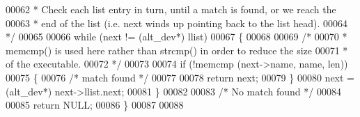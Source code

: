\begin{DoxyCode}
00062 \textcolor{comment}{   * Check each list entry in turn, until a match is found, or we reach the}
00063 \textcolor{comment}{   * end of the list (i.e. next winds up pointing back to the list head).}
00064 \textcolor{comment}{   */} 
00065 
00066   \textcolor{keywordflow}{while} (next != (alt_dev*) llist)
00067   \{
00068 
00069     \textcolor{comment}{/* }
00070 \textcolor{comment}{     * memcmp() is used here rather than strcmp() in order to reduce the size}
00071 \textcolor{comment}{     * of the executable.}
00072 \textcolor{comment}{     */}
00073 
00074     \textcolor{keywordflow}{if} (!memcmp (next->name, name, len))
00075     \{
00076       \textcolor{comment}{/* match found */}
00077 
00078       \textcolor{keywordflow}{return} next;
00079     \}
00080     next = (alt_dev*) next->llist.next;
00081   \}
00082   
00083   \textcolor{comment}{/* No match found */}
00084   
00085   \textcolor{keywordflow}{return} NULL;
00086 \}
00087 
00088 
\end{DoxyCode}
